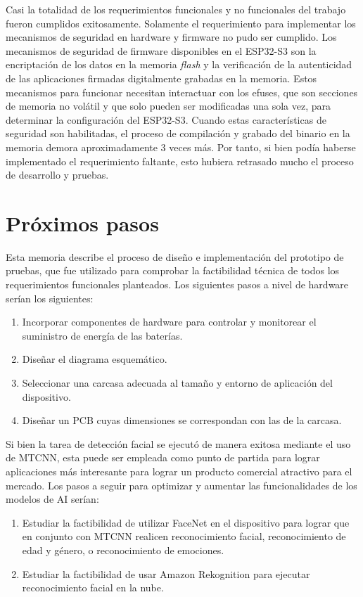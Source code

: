 Casi la totalidad de los requerimientos funcionales y no funcionales del trabajo fueron cumplidos exitosamente. Solamente el requerimiento para implementar los mecanismos de seguridad en hardware y firmware no pudo ser cumplido. Los mecanismos de seguridad de firmware disponibles en el ESP32-S3 son la encriptación de los datos en la memoria \textit{flash} y la verificación de la autenticidad de las aplicaciones firmadas digitalmente grabadas en la memoria. Estos mecanismos para funcionar necesitan interactuar con los efuses, que son secciones de memoria no volátil y que solo pueden ser modificadas una sola vez, para determinar la configuración del ESP32-S3. Cuando estas características de seguridad son habilitadas, el proceso de compilación y grabado del binario en la memoria demora aproximadamente 3 veces más. Por tanto, si bien podía haberse implementado el requerimiento faltante, esto hubiera retrasado mucho el proceso de desarrollo y pruebas.


\section{Próximos pasos}
Esta memoria describe el proceso de diseño e implementación del prototipo de pruebas, que fue utilizado para comprobar la factibilidad técnica de todos los requerimientos funcionales planteados. Los siguientes pasos a nivel de hardware serían los siguientes:
\begin{enumerate}
	\item Incorporar componentes de hardware para controlar y monitorear el suministro de energía de las baterías.
	\item Diseñar el diagrama esquemático.
	\item Seleccionar una carcasa adecuada al tamaño y entorno de aplicación del dispositivo.
	\item Diseñar un PCB cuyas dimensiones se correspondan con las de la carcasa.
\end{enumerate}


Si bien la tarea de detección facial se ejecutó de manera exitosa mediante el uso de MTCNN, esta puede ser empleada como punto de partida para lograr aplicaciones más interesante para lograr un producto comercial atractivo para el mercado. Los pasos a seguir para optimizar y aumentar las funcionalidades de los modelos de AI serían:
\begin{enumerate}
	\item Estudiar la factibilidad de utilizar FaceNet en el dispositivo para lograr que en conjunto con MTCNN realicen reconocimiento facial, reconocimiento de edad y género, o reconocimiento de emociones.
	\item Estudiar la factibilidad de usar Amazon Rekognition para ejecutar reconocimiento facial en la nube.
\end{enumerate}